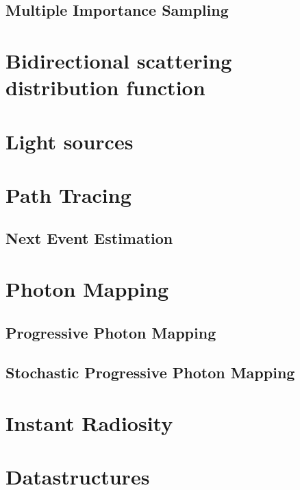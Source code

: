 \subsection{Multiple Importance Sampling}

\section{Bidirectional scattering distribution function}


\section{Light sources}


\section{Path Tracing}
\subsection{Next Event Estimation}



\section{Photon Mapping}
\label{sec:PM}

\subsection{Progressive Photon Mapping}

\subsection{Stochastic Progressive Photon Mapping}



\section{Instant Radiosity}

\section{Datastructures}


